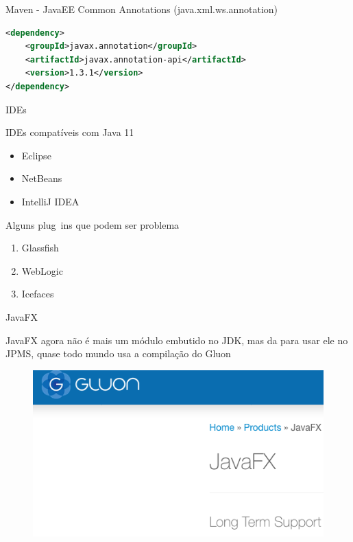 \documentclass[aspectratio=169]{beamer}
\begin{document}
\begin{frame}[fragile]{Maven - JavaEE}
Common Annotations (java.xml.ws.annotation)

\begin{lstlisting}[language=xml]
<dependency>
    <groupId>javax.annotation</groupId>
    <artifactId>javax.annotation-api</artifactId>
    <version>1.3.1</version>
</dependency>
\end{lstlisting}
\end{frame}

\begin{frame}[fragile]{IDEs}
    
    IDEs compatíveis com Java 11
    \begin{itemize}
        \item Eclipse
        \item NetBeans
        \item IntelliJ IDEA
    \end{itemize}
    
    Alguns plug~ins que podem ser problema
    \begin{enumerate}
        \item Glassfish
        \item WebLogic
        \item Icefaces
    \end{enumerate}
\end{frame}

\begin{frame}[fragile]{JavaFX}
    
    JavaFX agora não é mais um módulo embutido no JDK, mas da para usar ele no JPMS, quase todo mundo usa a compilação do Gluon
    \begin{figure}
        \centering
        \includegraphics[width=\linewidth]{Images/gluon}
    \end{figure}
\end{frame}
\end{document}

